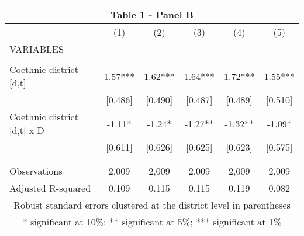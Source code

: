 \begin{tabular}{lccccc}
\multicolumn{6}{c}{Table 1 - Panel B} \\ \hline
 & (1) & (2) & (3) & (4) & (5) \\
VARIABLES &  &  &  &  &  \\ \hline
 &  &  &  &  &  \\
Coethnic district [d,t] & 1.57*** & 1.62*** & 1.64*** & 1.72*** & 1.55*** \\
 & [0.486] & [0.490] & [0.487] & [0.489] & [0.510] \\
Coethnic district [d,t] x D & -1.11* & -1.24* & -1.27** & -1.32** & -1.09* \\
 & [0.611] & [0.626] & [0.625] & [0.623] & [0.575] \\
 &  &  &  &  &  \\
 &  &  &  &  &  \\
Observations & 2,009 & 2,009 & 2,009 & 2,009 & 2,009 \\
 Adjusted R-squared & 0.109 & 0.115 & 0.115 & 0.119 & 0.082 \\ \hline
\multicolumn{6}{c}{ Robust standard errors clustered at the district level in parentheses} \\
\multicolumn{6}{c}{ * significant at 10\%; ** significant at 5\%; *** significant at 1\%} \\
\end{tabular}
